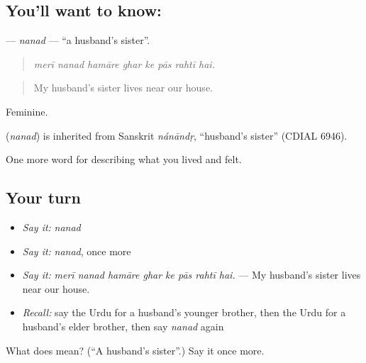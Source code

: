 \subsection*{You'll want to know: }
\textbf{} — \emph{nanad} — \textquotedblleft{}a husband's sister\textquotedblright{}.

\begin{quote}
       
\end{quote}

\begin{quote}
\emph{merī nanad hamāre ghar ke pās rahtī hai.}
\end{quote}

\begin{quote}
My husband's sister lives near our house.
\end{quote}

Feminine.

\begin{cousinweb}
\textbf{} (\emph{nanad}) is inherited from Sanskrit \emph{nánāndṛ}, \textquotedblleft{}husband's sister\textquotedblright{} (CDIAL 6946).
\end{cousinweb}

\begin{grammarlens}[title={What you've built}]
One more word for describing what you lived and felt.
\end{grammarlens}

\subsection*{Your turn}
\begin{itemize}
\raggedright
  \item \emph{Say it:} \emph{nanad}
  \item \emph{Say it:} \emph{nanad}, once more
  \item \emph{Say it:} \emph{merī nanad hamāre ghar ke pās rahtī hai.} — My husband's sister lives near our house.
  \item \emph{Recall:} say the Urdu for a husband's younger brother, then the Urdu for a husband's elder brother, then say \emph{nanad} again
\end{itemize}

\begin{tcolorbox}[breakable,colback=teal!4,colframe=teal!35!black,title={Before you move on}]
What does  mean? (\textquotedblleft{}A husband's sister\textquotedblright{}.) Say it once more.
\end{tcolorbox}
